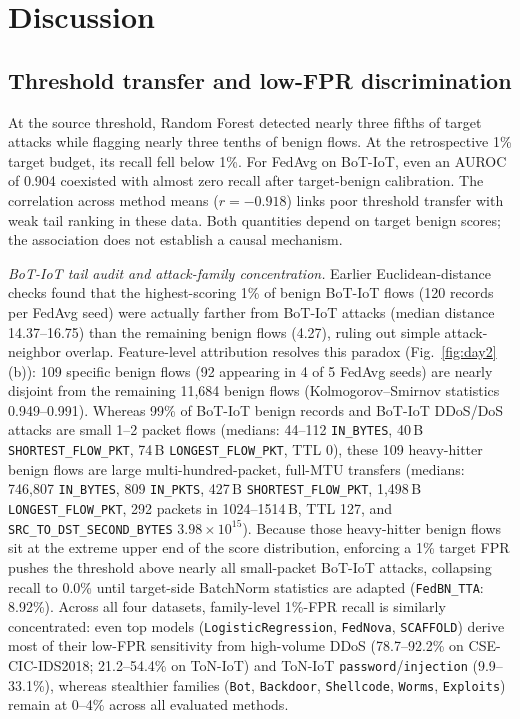 \documentclass[journal,10pt]{IEEEtran}
\begin{document}
\section{Discussion}
\subsection{Threshold transfer and low-FPR discrimination}
At the source threshold, Random Forest detected nearly three fifths of target attacks while flagging nearly three tenths of benign flows. At the retrospective 1\% target budget, its recall fell below 1\%. For FedAvg on BoT-IoT, even an AUROC of 0.904 coexisted with almost zero recall after target-benign calibration. The correlation across method means ($r=-0.918$) links poor threshold transfer with weak tail ranking in these data. Both quantities depend on target benign scores; the association does not establish a causal mechanism.

\emph{BoT-IoT tail audit and attack-family concentration.} Earlier Euclidean-distance checks found that the highest-scoring 1\% of benign BoT-IoT flows (120 records per FedAvg seed) were actually farther from BoT-IoT attacks (median distance 14.37--16.75) than the remaining benign flows (4.27), ruling out simple attack-neighbor overlap. Feature-level attribution resolves this paradox (Fig.~\ref{fig:day2}(b)): 109 specific benign flows (92 appearing in 4 of 5 FedAvg seeds) are nearly disjoint from the remaining 11,684 benign flows (Kolmogorov--Smirnov statistics 0.949--0.991). Whereas 99\% of BoT-IoT benign records and BoT-IoT DDoS/DoS attacks are small 1--2 packet flows (medians: 44--112 \texttt{IN\_BYTES}, 40\,B \texttt{SHORTEST\_FLOW\_PKT}, 74\,B \texttt{LONGEST\_FLOW\_PKT}, TTL 0), these 109 heavy-hitter benign flows are large multi-hundred-packet, full-MTU transfers (medians: 746,807 \texttt{IN\_BYTES}, 809 \texttt{IN\_PKTS}, 427\,B \texttt{SHORTEST\_FLOW\_PKT}, 1,498\,B \texttt{LONGEST\_FLOW\_PKT}, 292 packets in 1024--1514\,B, TTL 127, and \texttt{SRC\_TO\_DST\_SECOND\_BYTES} $3.98\times 10^{15}$). Because those heavy-hitter benign flows sit at the extreme upper end of the score distribution, enforcing a 1\% target FPR pushes the threshold above nearly all small-packet BoT-IoT attacks, collapsing recall to 0.0\% until target-side BatchNorm statistics are adapted (\texttt{FedBN\_TTA}: 8.92\%). Across all four datasets, family-level 1\%-FPR recall is similarly concentrated: even top models (\texttt{LogisticRegression}, \texttt{FedNova}, \texttt{SCAFFOLD}) derive most of their low-FPR sensitivity from high-volume DDoS (78.7--92.2\% on CSE-CIC-IDS2018; 21.2--54.4\% on ToN-IoT) and ToN-IoT \texttt{password}/\texttt{injection} (9.9--33.1\%), whereas stealthier families (\texttt{Bot}, \texttt{Backdoor}, \texttt{Shellcode}, \texttt{Worms}, \texttt{Exploits}) remain at 0--4\% across all evaluated methods.
\end{document}
